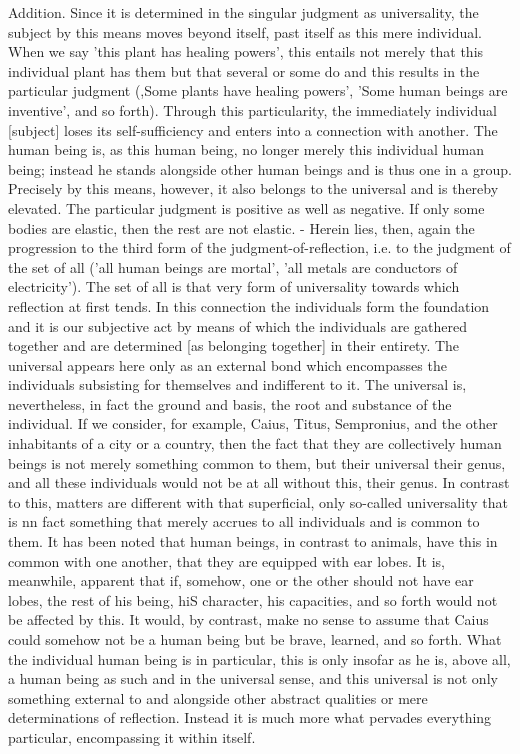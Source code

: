 Addition. Since it is determined in the singular judgment as universality, the
subject by this means moves beyond itself, past itself as this mere individual.
When we say 'this plant has healing powers', this entails not merely that this
individual plant has them but that several or some do and this results in the
particular judgment (,Some plants have healing powers', 'Some human beings are
inventive', and so forth). Through this particularity, the immediately individual
[subject] loses its self-sufficiency and enters into a connection
with another. The human being is, as this human being, no longer merely this
individual human being; instead he stands alongside other human beings and is
thus one in a group. Precisely by this means, however, it also belongs to
the universal and is thereby elevated. The particular judgment is positive as well
as negative. If only some bodies are elastic, then the rest are not elastic. - Herein
lies, then, again the progression to the third form of the judgment-of-reflection,
i.e. to the judgment of the set of all ('all human beings are mortal', 'all metals are
conductors of electricity'). The set of all is that very form of universality
towards which reflection at first tends. In this connection the individuals form
the foundation and it is our subjective act by means of which the individuals
are gathered together and are determined [as belonging together] in their entirety.
The universal appears here only as an external bond which
encompasses the individuals subsisting for themselves and indifferent to it. The
universal is, nevertheless, in fact the ground and basis, the root and substance of the
individual. If we consider, for example, Caius, Titus, Sempronius, and the other
inhabitants of a city or a country, then the fact that they are collectively human
beings is not merely something common to them, but their universal their genus,
and all these individuals would not be at all without this, their genus. In contrast
to this, matters are different with that superficial, only so-called universality that
is nn fact something that merely accrues to all individuals and is common to them.
It has been noted that human beings, in contrast to animals, have this in common
with one another, that they are equipped with ear lobes. It is, meanwhile, apparent
that if, somehow, one or the other should not have ear lobes, the rest of his being,
hiS character, his capacities, and so forth would not be affected by this. It would,
by contrast, make no sense to assume that Caius could somehow not be a human
being but be brave, learned, and so forth. What the individual human being is in
particular, this is only insofar as he is, above all, a human being as such and in the
universal sense, and this universal is not only something external
to and alongside other abstract qualities or mere determinations of reflection.
Instead it is much more what pervades everything particular, encompassing it
within itself.

